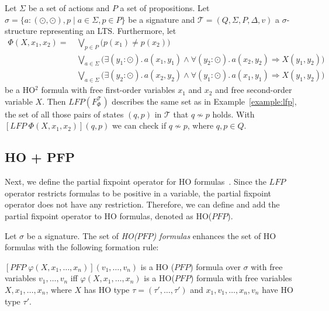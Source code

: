 \begin{example}
    \label{example:ho_lfp} 
    Let $\Sigma$ be a set of actions and $P$ a set of propositions. Let $\sigma = \{a: (\odot, \odot), p \mid a \in \Sigma, p \in P\}$ be a signature and $\mathcal{T} = (Q, \Sigma, P, \Delta, v)$ a $\sigma$-structure representing an LTS. Furthermore, let 
\begin{align*}
\Phi(X, x_1, x_2) =\, &\underset{p\in P}{\bigvee} \big(p(x_1) \neq p(x_2)\big)\\&
 \underset{a\in\Sigma}{\bigvee} \big(\exists (y_1 \colon \odot).\, a(x_1, y_1) \wedge \forall (y_2 
 \colon \odot).\, a(x_2,y_2) \Rightarrow X(y_1, y_2)\big) \\&
\underset{a\in\Sigma}{\bigvee} \big(\exists (y_2 \colon \odot).\, a(x_2, y_2) \wedge \forall (y_1 
\colon \odot).\, a(x_1,y_1) \Rightarrow X(y_1, y_2)\big)
\end{align*}
be a HO$^2$ formula with free first-order variables $x_1$ and $x_2$ and free second-order variable $X$.
Then $LFP(F_\Phi^\mathcal{T})$ describes the same set as in Example~\ref{example:lfp}, the set of all those pairs of states $(q, p)$ in $\mathcal{T}$ that $q\not\sim p$ holds. With $[LFP\; \Phi(X, x_1, x_2)](q, p)$ we can check if $q \not\sim p$, where $q, p \in Q$. 
\end{example}

\subsection{HO + PFP}\label{subsec:ho+Pfp}

Next, we define the partial fixpoint operator for HO formulas~\cite{schewe2006fixpoint}. Since the
$\mathit{LFP}$ operator restricts formulas to be positive in a variable, the partial fixpoint operator does not have any
restriction. Therefore, we can define and
add the partial fixpoint operator to HO formulas, denoted as HO($\mathit{PFP}$).

\begin{definition}
    Let $\sigma$ be a signature. The set of \emph{HO($\mathit{PFP}$) formulas} enhances the set of HO formulas with the
    following formation rule:
    \begin{compactitem}
        \item $[\mathit{PFP}\;\varphi(X, x_1, \dots, x_n)](v_1, \dots, v_n)$ is a HO
        ($\mathit{PFP}$) formula over $\sigma$ with free variables $v_1, \dots, v_n$ iff $\varphi(X, x_1, \dots, x_n)
        $ is a HO($\mathit{PFP}$) formula with free variables $X, x_1, \dots, x_n$, where $X$ has HO type $\tau =
        (\tau', \dots, \tau')$ and $x_1, v_1, \dots, x_n, v_n$ have HO type $\tau'$.
    \end{compactitem}
\end{definition}

